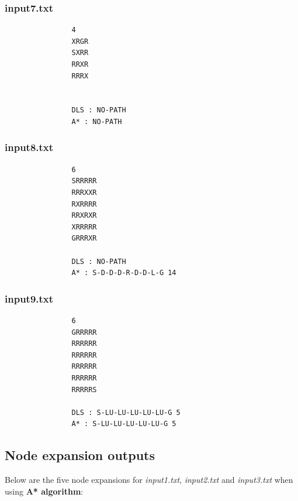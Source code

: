 \documentclass{article}
\begin{document}
		\subsubsection{input7.txt}
	\begin{lstlisting}
				4
				XRGR
				SXRR
				RRXR
				RRRX
				
				
				DLS : NO-PATH
				A* : NO-PATH
	\end{lstlisting}
	
		\subsubsection{input8.txt}
	\begin{lstlisting}
				6
				SRRRRR
				RRRXXR
				RXRRRR
				RRXRXR
				XRRRRR
				GRRRXR
				
				DLS : NO-PATH
				A* : S-D-D-D-R-D-D-L-G 14
	\end{lstlisting}
	
	\subsubsection{input9.txt}
	\begin{lstlisting}
				6
				GRRRRR
				RRRRRR
				RRRRRR
				RRRRRR
				RRRRRR
				RRRRRS
				
				DLS : S-LU-LU-LU-LU-LU-G 5
				A* : S-LU-LU-LU-LU-LU-G 5
	\end{lstlisting}
	\newpage
	\subsection{Node expansion outputs}
	Below are the five node expansions for \emph{input1.txt}, \emph{input2.txt} and \emph{input3.txt} when using \textbf{A* algorithm}:
	
\end{document}
